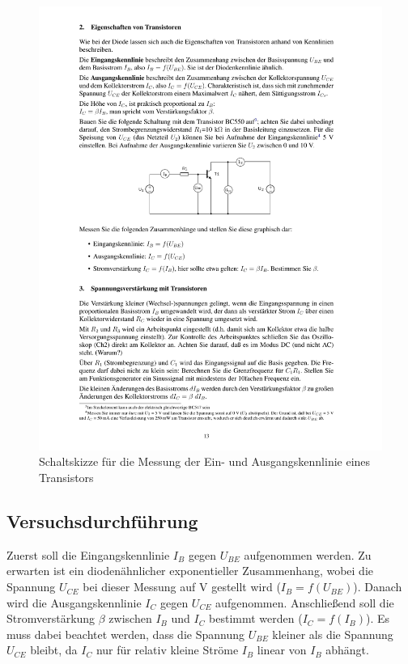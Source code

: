 \documentclass[12pt,a4paper]{article}
\begin{document}
\begin{figure}[H] 
  \centering
    \includegraphics[trim = 10mm 145mm 10mm 90mm, clip, scale = 1]{ep3_14[Page13].pdf}
  	\caption[Schaltskizze für die Messung der Ein- und Ausgangskennlinie eines Transistors]{Schaltskizze für die Messung der Ein- und Ausgangskennlinie eines Transistors\footnotemark}
  \label{fig:1}
\end{figure}

\subsection{Versuchsdurchführung}
Zuerst soll die Eingangskennlinie  $I_B$ gegen $U_{BE}$ aufgenommen werden. Zu erwarten ist ein diodenähnlicher exponentieller Zusammenhang, wobei die Spannung $U_{CE}$  bei dieser Messung auf \unit[5]{V} gestellt wird ($I_B = f(U_{BE})$). Danach wird die Ausgangskennlinie $I_C$ gegen $U_{CE}$ aufgenommen.
Anschließend soll die Stromverstärkung $\beta$ zwischen $I_B$ und $I_C$ bestimmt werden ($I_C = f(I_B)$). Es muss dabei beachtet werden, dass die Spannung $U_{BE}$ kleiner als die Spannung $U_{CE}$ bleibt, da $I_C$ nur für relativ kleine Ströme $I_B$ linear von $I_B$ abhängt.
\end{document}
